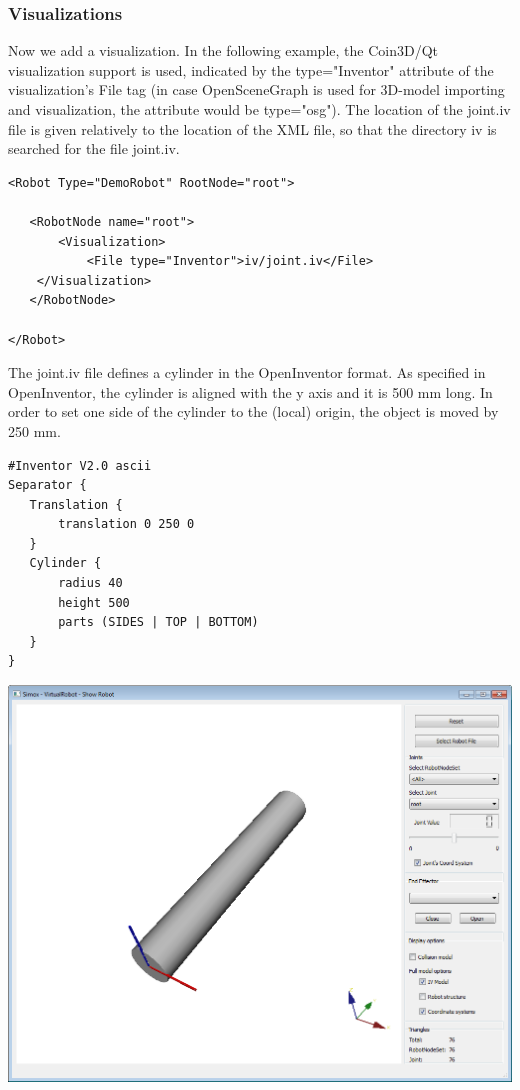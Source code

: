 \subsubsection{Visualizations}
\par
Now we add a visualization. In the following example, the Coin3D/Qt visualization support is used, indicated by the type="Inventor" attribute of the visualization's File tag (in case OpenSceneGraph is used for 3D-model importing and visualization, the attribute would be type="osg"). The location of the joint.iv file is given relatively to the location of the XML file, so that the directory iv is searched for the file joint.iv. 
\begin{lstlisting}
<Robot Type="DemoRobot" RootNode="root">

   <RobotNode name="root">
       <Visualization>
           <File type="Inventor">iv/joint.iv</File>
    </Visualization>
   </RobotNode>

</Robot>
\end{lstlisting}
\par
The joint.iv file defines a cylinder in the OpenInventor format. As specified in OpenInventor, the cylinder is aligned with the y axis and it is 500 mm long. In order to set one side of the cylinder to the (local) origin, the object is moved by 250 mm. 
\par
\begin{lstlisting}
#Inventor V2.0 ascii
Separator {
   Translation {
       translation 0 250 0
   }
   Cylinder {
       radius 40
       height 500
       parts (SIDES | TOP | BOTTOM)
   }
}
\end{lstlisting}
\includegraphics[width=\textwidth]{Tutorial2}
\par
